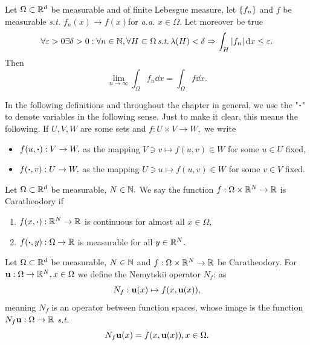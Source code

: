 \documentclass{article}
\begin{document}
\begin{theorem}[Vitali]
    Let $\Omega \subset {\mathbb R}^{d}$ be measurable and of finite Lebesgue measure, let $\qty{f_n}$ and $f$ be measurable \textit{s.t.} $f_n(x) \to f(x)$for \textit{a.a.} $x \in \Omega$. Let moreover be true
    \[
	    \forall \varepsilon > 0 \exists \delta >0: \forall n \in {\mathbb N}, \forall H \subset \Omega \, \text{\textit{s.t.}} \, \lambda(H) < \delta \Rightarrow \int_{H}|f_n|\dd{x} \leq \varepsilon.
    \]
    Then
    \[
	    \lim_{n\to \infty} \int_{\Omega}f_n\dd{x} = \int_{\Omega}f\dd{x}.
    \]
\end{theorem}

\begin{remark}
    In the following definitions and throughout the chapter in general, we use the "$\vdot$" to denote variables in the following sense. Just to make it clear, this means the following.
    If $U,V,W$ are some sets and $f: U \times V \to W,$ we write
    \begin{itemize}
	    \item $f\qty(u, \vdot): V \to W,$ as the mapping $V \ni v \mapsto f(u,v) \in W$ for some $u \in U$ fixed,
	    \item $f\qty(\vdot, v): U \to W,$ as the mapping $U \ni u \mapsto f(u,v) \in W$ for some $v \in V$ fixed.
    \end{itemize}
\end{remark}

\begin{definition}
	Let $\Omega \subset {\mathbb R}^{d}$ be measurable, $N \in {\mathbb N}.$ We say the function $f: \Omega \times {\mathbb R}^{N} \to {\mathbb R}$ is Caratheodory if
	\begin{enumerate}
		\item $f\qty(x, \vdot): \R^{N} \to \R$ is continuous for almost all $x \in \Omega,$
		\item $f\qty(\vdot, y): \Omega \to \R$ is measurable for all $y \in {\mathbb R}^{N}.$
	\end{enumerate}
\end{definition}

\begin{definition}
	Let $\Omega \subset {\mathbb R}^{d}$ be measurable, $N \in {\mathbb N}$ and $f: \Omega \times {\mathbb R}^{N} \to {\mathbb R}$ be Caratheodory. For $\vb{u}: \Omega \to {\mathbb R}^N, x \in \Omega$ we define the Nemytskii operator $N_f$: as
    \[
	    N_f: \vb{u}(x) \mapsto f(x,\vb{u}(x)),
    \]
    meaning $N_f$ is an operator between function spaces, whose image is the function $N_f\vb{u}:\Omega \to {\mathbb R} $ \textit{s.t.}
    \[
	    N_f\vb{u}(x) = f\qty(x,\vb{u}(x)), x \in \Omega.
    \]
    
\end{definition}
\end{document}
